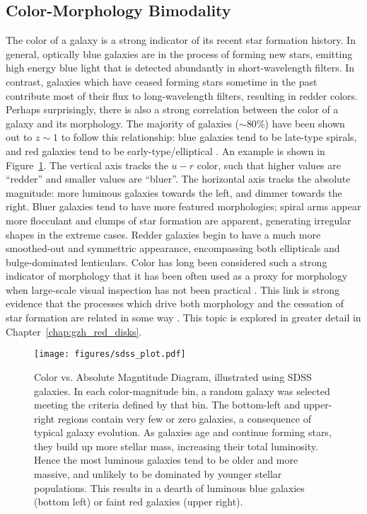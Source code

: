 \subsection{Color-Morphology Bimodality}

The color of a galaxy is a strong indicator of its recent star formation history. In general, optically blue galaxies are in the process of forming new stars, emitting high energy blue light that is detected abundantly in short-wavelength filters. In contrast, galaxies which have ceased forming stars sometime in the past contribute most of their flux to long-wavelength filters, resulting in redder colors. Perhaps surprisingly, there is also a strong correlation between the color of a galaxy and its morphology. The majority of galaxies ($\sim80\%$) have been shown out to $z\sim1$ to follow this relationship: blue galaxies tend to be late-type spirals, and red galaxies tend to be early-type/elliptical \citep{Tully1982,Strateva2001,Baldry2004,Conselice2006,Martin2007,Mignoli2009}. An example is shown in Figure~\ref{fig:cmd}. The vertical axis tracks the $u-r$ color, such that higher values are ``redder'' and smaller values are ``bluer''. The horizontal axis tracks the absolute magnitude: more luminous galaxies towards the left, and dimmer towards the right. Bluer galaxies tend to have more featured morphologies; spiral arms appear more flocculant and clumps of star formation are apparent, generating irregular shapes in the extreme cases. Redder galaxies begin to have a much more smoothed-out and symmettric appearance, encompassing both ellipticals and bulge-dominated lenticulars. Color has long been considered such a strong indicator of morphology that it has been often used as a proxy for morphology when large-scale visual inspection has not been practical \citep{Cooray2005,Lee2007,Salimbeni2008,Simon2009}. This link is strong evidence that the processes which drive both morphology and the cessation of star formation are related in some way \citep{Masters2010,Buta2013}. This topic is explored in greater detail in Chapter~\ref{chap:gzh_red_disks}. 

\begin{figure}
\centering
\texttt{[image: figures/sdss\_plot.pdf]}
\label{fig:cmd}
\caption{Color vs. Absolute Magntitude Diagram, illustrated using SDSS galaxies. In each color-magnitude bin, a random galaxy was selected meeting the criteria defined by that bin. The bottom-left and upper-right regions contain very few or zero galaxies, a consequence of typical galaxy evolution. As galaxies age and continue forming stars, they build up more stellar mass, increasing their total luminosity. Hence the most luminous galaxies tend to be older and more massive, and unlikely to be dominated by younger stellar populations. This results in a dearth of luminous blue galaxies (bottom left) or faint red galaxies (upper right).  }
\end{figure}

